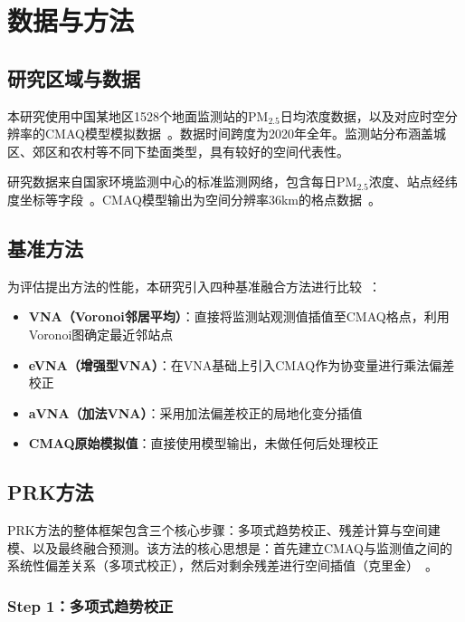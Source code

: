 \documentclass[UTF8, a4paper, 12pt]{article}
\begin{document}
\section{数据与方法}

\subsection{研究区域与数据}

本研究使用中国某地区1528个地面监测站的PM$_{2.5}$日均浓度数据，以及对应时空分辨率的CMAQ模型模拟数据~\cite{foley2010CMAQ}。数据时间跨度为2020年全年。监测站分布涵盖城区、郊区和农村等不同下垫面类型，具有较好的空间代表性。

研究数据来自国家环境监测中心的标准监测网络，包含每日PM$_{2.5}$浓度、站点经纬度坐标等字段~\cite{chang2015outlier}。CMAQ模型输出为空间分辨率36km的格点数据~\cite{rodriguez2025downscaling}。

\subsection{基准方法}

为评估提出方法的性能，本研究引入四种基准融合方法进行比较~\cite{liu2019spatial}：

\begin{itemize}
    \item \textbf{VNA（Voronoi邻居平均）}：直接将监测站观测值插值至CMAQ格点，利用Voronoi图确定最近邻站点~\cite{singh2019enhanced}

    \item \textbf{eVNA（增强型VNA）}：在VNA基础上引入CMAQ作为协变量进行乘法偏差校正

    \item \textbf{aVNA（加法VNA）}：采用加法偏差校正的局地化变分插值

    \item \textbf{CMAQ原始模拟值}：直接使用模型输出，未做任何后处理校正
\end{itemize}

\subsection{PRK方法}

PRK方法的整体框架包含三个核心步骤：多项式趋势校正、残差计算与空间建模、以及最终融合预测。该方法的核心思想是：首先建立CMAQ与监测值之间的系统性偏差关系（多项式校正），然后对剩余残差进行空间插值（克里金）~\cite{krige1951note}。

\subsubsection{Step 1：多项式趋势校正}
\end{document}
